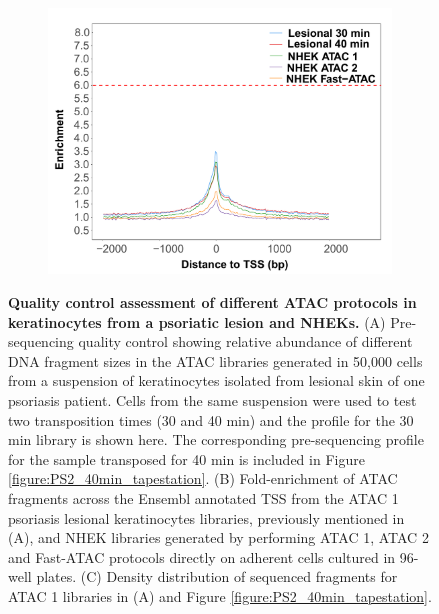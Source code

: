 \begin{figure}[htbp]
\begin{subfigure}{0.45\textwidth}
\includegraphics[width=\textwidth]{./Results1/pdfs/ATAC_skin_TSS_enrichment_PS02_30_40min_NHEK_ATAC1_ATAC_2_FAST_ATAC}
\caption{\textbf{}} %
\end{subfigure}
\caption[Quality control assessment of different ATAC protocols in keratinocytes from a psoriatic lesion and NHEKs.]{\textbf{Quality control assessment of different ATAC protocols in keratinocytes from a psoriatic lesion and NHEKs.} (A) Pre-sequencing quality control showing relative abundance of different DNA fragment sizes in the ATAC libraries generated in 50,000 cells from a suspension of keratinocytes isolated from lesional skin of one psoriasis patient. Cells from the same suspension were used to test two transposition times (30 and 40 min) and the profile for the 30 min library is shown here. The corresponding pre-sequencing profile for the sample transposed for 40 min is included in Figure \ref{figure:PS2_40min_tapestation}. (B) Fold-enrichment of ATAC fragments across the Ensembl annotated TSS from the ATAC 1 psoriasis lesional keratinocytes libraries, previously mentioned in (A), and NHEK libraries generated by performing ATAC 1, ATAC 2 and Fast-ATAC protocols directly on adherent cells cultured in 96-well plates. (C) Density distribution of sequenced fragments for ATAC 1 libraries in (A) and Figure \ref{figure:PS2_40min_tapestation}.}
\label{figure:PS02_skin_ATAC_QC_assessment}
\end{figure} 


